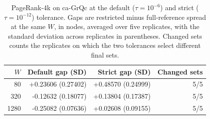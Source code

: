 \begin{table}[htbp]
\caption{PageRank-4k on ca-GrQc at the default ($\tau=10^{-6}$) and strict ($\tau=10^{-12}$) tolerance. Gaps are restricted minus full-reference spread at the same $W$, in nodes, averaged over five replicates, with the standard deviation across replicates in parentheses. Changed sets counts the replicates on which the two tolerances select different final sets.}\label{tab:precision-output}
\centering\begin{tabular}{rrrr}\toprule
$W$ & Default gap (SD) & Strict gap (SD) & Changed sets \\ \midrule
80 & +0.23606 (0.27402) & +0.48570 (0.24999) & 5/5 \\
320 & -0.12632 (0.18077) & +0.13804 (0.17387) & 5/5 \\
1280 & -0.25082 (0.07636) & +0.02608 (0.09155) & 5/5 \\
\bottomrule\end{tabular}
\end{table}
